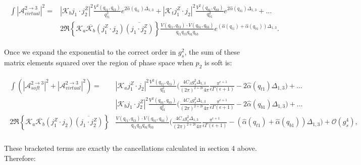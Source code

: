 		\begin{align}
		\begin{split}
			\int|\mathcal{A}^{2\rightarrow3}_{virtual}|^2 = &|\mathcal{K}_bj_1\cdot j_2^Z|^2
			\frac{V^2(q_{t1}, q_{t3})}{q_{t1}^2}e^{2\hat{\alpha}(q_{t1})\Delta_{1,3}} +
			|\mathcal{K}_tj_1^Z\cdot j_2|^2 \frac{V^2(q_{b1}, q_{b3})}{q_{b1}^2}e^{2\hat{\alpha}(q_{b1})\Delta_{1,3}} + \ldots \\
			& 2\Re\left\{\mathcal{K}_a\overline{\mathcal{K}_b}  (j_1^Z\cdot j_2)\overline{(j_1\cdot j_2^Z)}\right\}
			\frac{V(q_{t1}, q_{t3})\cdot V(q_{b1}, q_{b3})}{q_{t1}q_{t3}q_{b1}q_{b3}}e^{(\hat{\alpha}(q_{t1}) +
			\hat{\alpha}(q_{b1}))\Delta_{1,3}}.
		\end{split}
		\end{align}

		Once we expand the exponential to the correct order in $g_s^2$, the sum of these
		matrix elements squared over the region of phase space when $p_2$ is soft is:

		\begin{align}
		\begin{split}
			\int\left(|\mathcal{A}^{2\rightarrow3}_{soft}|^2 + |\mathcal{A}^{2\rightarrow3}_{virtual}|^2\right) =
			&|\mathcal{K}_aj_1^Z\cdot j_2|^2 \frac{V^2(q_{t1}, q_{t3})}{q_{t1}^2}
			{\Bigg(\frac{4C_Ag_s^2\Delta_{1,3}}{(2\pi)^{2+2\epsilon}4\pi}\frac{\pi^{\epsilon+1}}
			{\epsilon\Gamma(\epsilon+1)} - 2\hat{\alpha}(q_{t1})\Delta_{1,3}\Bigg)}+\ldots \\
			& |\mathcal{K}_bj_1\cdot j_2^Z|^2 \frac{V^2(q_{b1}, q_{b3})}{q_{b1}^2}
			{\Bigg(\frac{4C_Ag_s^2\Delta_{1,3}}{(2\pi)^{2+2\epsilon}4\pi}\frac{\pi^{\epsilon+1}}
			{\epsilon\Gamma(\epsilon+1)} - 2\hat{\alpha}(q_{b1})\Delta_{1,3}\Bigg)}+\ldots \\
			2\Re\left\{\mathcal{K}_a\overline{\mathcal{K}_b}  (j_1^Z\cdot j_2)\overline{(j_1\cdot j_2^Z)}\right\}&
			\frac{V(q_{t1}, q_{t3})\cdot V(q_{b1}, q_{b3})}{q_{t1}q_{t3}q_{b1}q_{b3}}{\Bigg(\frac{4C_Ag_s^2\Delta_{1,3}}
			{(2\pi)^{2+2\epsilon}4\pi}\frac{\pi^{\epsilon+1}}{\epsilon\Gamma(\epsilon+1)} -
			(\hat{\alpha}(q_{t1}) + \hat{\alpha}(q_{b1}))\Delta_{1,3}\Bigg)} + \mathcal{O}(g_s^4),\\
		\end{split}
		\end{align}

		These bracketed terms are exactly the cancellations calculated in section 4 above.  Therefore:

